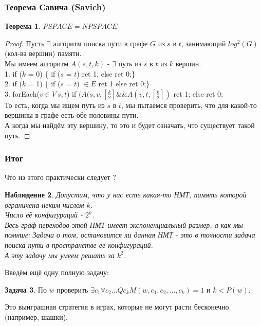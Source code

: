 \documentclass{beamer}
\theoremstyle{plain}
\newtheorem{thm}{Теорема}
\newtheorem{obs}[thm]{Наблюдение}
\theoremstyle{definition}
\newtheorem{prob-rus}[thm]{Задача}
\begin{document}
\begin{frame}
    \frametitle{Теорема Савича (Savich)}
    \begin{thm}
        $PSPACE = NPSPACE$
    \end{thm}
    \small
    \begin{proof}
        Пусть $\exists$ алгоритм поиска пути в графе $G$ из $s$ в $t$, занимающий
        $log^2(G)$ (кол-ва вершин) памяти. \\
        Мы имеем алгоритм $A(s, t, k)$ - $\exists$ путь из $s$ в $t$ из $k$ вершин. \\
        1. if ($k$ = 0) \{ if ($s$ = $t$) ret 1; else ret 0;\} \\
        2. if ($k$ = 1) \{ if ($s$ = $t$) $\in E$ ret 1 else ret 0;\} \\
        3. forEach($v \in V \ s,t$)
              if $(A(s, v, [\frac{k}{2}]$\&\&$A(v, t, [\frac{k}{2}])$ ret 1;
              else ret 0; \\
        То есть, когда мы ищем путь из $s$ в $t$, мы пытаемся проверить, что для какой-то
        вершины в графе есть обе половины пути. \\
        А когда мы найдём эту вершину, то это и будет означать, что существует такой путь.
    \end{proof}
\end{frame}

\begin{frame}
    \frametitle{Итог}
    Что из этого практически следует ? \\
    \begin{obs}
        Допустим, что у нас есть какая-то НМТ, память которой ограничена неким числом $k$. \\
        Число её конфигураций - $2^k$. \\
        Весь граф переходов этой НМТ имеет экспоненциальный размер, а как мы помним: Задача о том,
        остановится ли данная НМТ - это в точности задача поиска пути в пространстве её конфигураций.\\
        А эту задачу мы умеем решать за $k^2$.
    \end{obs}
\end{frame}

\begin{frame}
    Введём ещё одну полную задачу:
    \begin{prob-rus}
        По $w$ проверить $\exists c_1 \forall c_2 ... Qc_k M(w, c_1, c_2,..., c_k) = 1$ и
        $k < P(w)$.
    \end{prob-rus}
    Это выиграшная стратегия в играх, которые не могут расти
    бесконечно. (например, шашки).
\end{frame}
\end{document}
